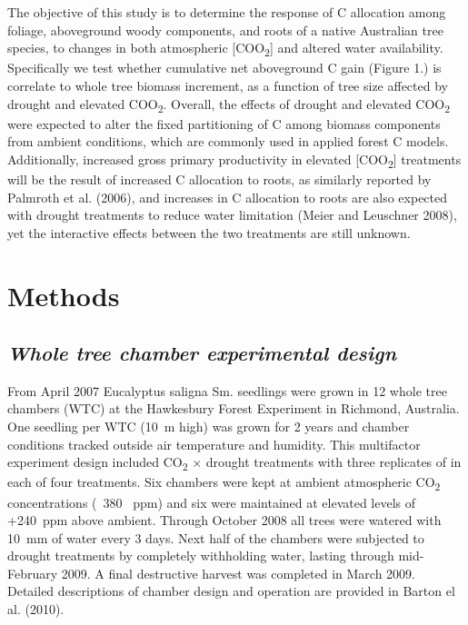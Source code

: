 \documentclass[a4paper]{article}
\begin{document}
The objective of this study is to determine the response of C allocation among foliage, aboveground woody components, and roots of a native Australian tree species, to changes in both atmospheric [COO\textsubscript{2}] and altered water availability. Specifically we test whether cumulative net aboveground C gain (Figure 1.) is correlate to whole tree biomass increment, as a function of tree size affected by drought and elevated COO\textsubscript{2}. Overall, the effects of drought and elevated COO\textsubscript{2} were expected to alter the fixed partitioning of C among biomass components from ambient conditions, which are commonly used in applied forest C models. Additionally, increased gross primary productivity in elevated [COO\textsubscript{2}] treatments will be the result of increased C allocation to roots, as similarly reported by Palmroth et al. (2006), and increases in C allocation to roots are also expected with drought treatments to reduce water limitation (Meier and Leuschner 2008), yet the interactive effects between the two treatments are still unknown.

\section*{Methods}

\subsection*{\textit{Whole tree chamber experimental design}}

From April 2007 Eucalyptus saligna Sm. seedlings were grown in 12 whole tree chambers (WTC) at the Hawkesbury Forest Experiment in Richmond, Australia. One seedling per WTC (10~m high) was grown for 2 years and chamber conditions tracked outside air temperature and humidity.  This multifactor experiment design included CO\textsubscript{2} × drought treatments with three replicates of in each of four treatments. Six chambers were kept at ambient atmospheric CO\textsubscript{2} concentrations (~380 ~ppm) and six were maintained at elevated levels of +240~ppm above ambient.  Through October 2008 all trees were watered with 10~mm of water every 3 days.  Next half of the chambers were subjected to drought treatments by completely withholding water, lasting through mid-February 2009. A final destructive harvest was completed in March 2009. Detailed descriptions of chamber design and operation are provided in Barton el al. (2010).
\end{document}
